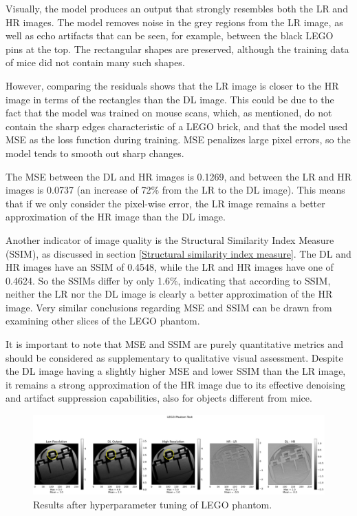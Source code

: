 \documentclass[twocolumn]{article}
\begin{document}
Visually, the model produces an output that strongly resembles both the LR and HR images. The model removes noise in the grey regions from the LR image, as well as echo artifacts that can be seen, for example, between the black LEGO pins at the top. The rectangular shapes are preserved, although the training data of mice did not contain many such shapes.

However, comparing the residuals shows that the LR image is closer to the HR image in terms of the rectangles than the DL image. This could be due to the fact that the model was trained on mouse scans, which, as mentioned, do not contain the sharp edges characteristic of a LEGO brick, and that the model used MSE as the loss function during training. MSE penalizes large pixel errors, so the model tends to smooth out sharp changes.

The MSE between the DL and HR images is 0.1269, and between the LR and HR images is 0.0737 (an increase of 72\% from the LR to the DL image). This means that if we only consider the pixel-wise error, the LR image remains a better approximation of the HR image than the DL image.

Another indicator of image quality is the Structural Similarity Index Measure (SSIM), as discussed in section \ref{Structural similarity index measure}. The DL and HR images have an SSIM of 0.4548, while the LR and HR images have one of 0.4624. So the SSIMs differ by only 1.6\%, indicating that according to SSIM, neither the LR nor the DL image is clearly a better approximation of the HR image. Very similar conclusions regarding MSE and SSIM can be drawn from examining other slices of the LEGO phantom.

It is important to note that MSE and SSIM are purely quantitative metrics and should be considered as supplementary to qualitative visual assessment. Despite the DL image having a slightly higher MSE and lower SSIM than the LR image, it remains a strong approximation of the HR image due to its effective denoising and artifact suppression capabilities, also for objects different from mice.




\begin{figure}
    \centering
    \includegraphics[width=1\linewidth]{LEGO_phantom_test.png}
    \caption{Results after hyperparameter tuning of LEGO phantom.}
    \label{fig:lego_phantom_test}
\end{figure}
\end{document}

